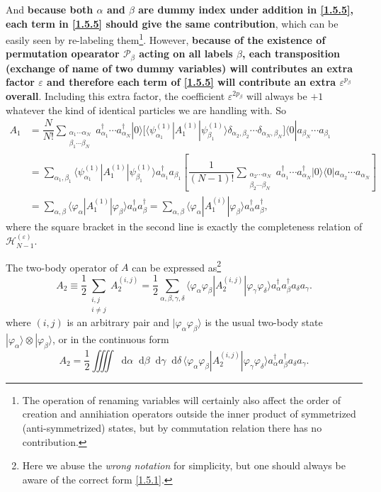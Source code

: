 \documentclass[b5paper,10pt,UTF8]{book}
\newcommand*\dd{\mathop{}\!\mathrm{d}}
\numberwithin{equation}{section}
\begin{document}
\begin{Proof}
			And \textbf{because both $\alpha$ and $\beta$ are dummy index under addition in \eqref{1.5.5}, each term in \eqref{1.5.5} should give the same contribution}, which can be easily seen by re-labeling them\footnote{ The operation of renaming variables will certainly also affect the order of creation and annihiation operators outside the inner product of symmetrized (anti-symmetrized) states, but by commutation relation there has no contribution.}. However, \textbf{because of the existence of permutation opearator $\mathcal{P}_\beta$ acting on all labels $\beta$, each transposition (exchange of name of two dummy variables) will contributes an extra factor $\varepsilon$ and therefore each term of \eqref{1.5.5} will contribute an extra $\varepsilon^{p_\beta}$ overall}. Including this extra factor, the coefficient $\varepsilon^{2p_\beta}$ will always be $+1$ whatever the kind of identical particles we are handling with. So 
			\begin{align}
				A_1&=\dfrac{N}{N!}\sum_{\substack{\alpha_1\cdots\alpha_N\\\beta_1\cdots\beta_N}}a_{\alpha_1}^\dagger\cdots a_{\alpha_N}^\dagger|0\rangle\bigg[\langle\psi_{\alpha_1}^{(1)}|A_1^{(1)}|\psi_{\beta_1}^{(1)}\rangle\delta_{\alpha_2,\beta_2}\cdots\delta_{\alpha_N,\beta_N}\bigg]\langle0|a_{\beta_N}\cdots a_{\beta_1}\nonumber\\
				&=\sum_{\alpha_1,\beta_1}\langle\psi_{\alpha_1}^{(1)}|A_1^{(1)}|\psi_{\beta_1}^{(1)}\rangle a_{\alpha_1}^\dagger a_{\beta_1}\left[\dfrac{1}{(N-1)!}\sum_{\substack{\alpha_2\cdots\alpha_N\\\beta_2\cdots\beta_N}}a_{\alpha_1}^\dagger\cdots a_{\alpha_N}^\dagger|0\rangle\langle0|a_{\alpha_2}\cdots a_{\alpha_N}\right]\nonumber\\
				&=\sum_{\alpha,\beta}\langle\varphi_\alpha|A_1^{(1)}|\varphi_\beta\rangle a_\alpha^\dagger a_\beta^\dagger=\sum_{\alpha,\beta}\langle\varphi_\alpha|A_1^{(i)}|\varphi_\beta\rangle a_\alpha^\dagger a_\beta^\dagger\nonumber,
			\end{align}
			where the square bracket in the second line is exactly the completeness relation of $\mathcal{H}_{N-1}^{(\varepsilon)}$.
		\end{Proof}
		\begin{Proposition}
			The two-body operator of $A$ can be expressed as\footnote{Here we abuse the \emph{wrong notation} for simplicity, but one should always be aware of the correct form \eqref{1.5.1}.}
			\begin{equation}\label{1.5.6}
				A_2\equiv\dfrac{1}{2}\sum_{\substack{i,j\\i\neq j}}A_2^{(i,j)}=\dfrac{1}{2}\sum_{\alpha,\beta,\gamma,\delta}\langle\varphi_\alpha\varphi_\beta|A_2^{(i,j)}|\varphi_\gamma\varphi_\delta\rangle a_\alpha^\dagger a_\beta^\dagger a_\delta a_\gamma.
			\end{equation}
			where $(i,j)$ is an arbitrary pair and $|\varphi_\alpha\varphi_\beta\rangle$ is the usual two-body state $|\varphi_\alpha\rangle\otimes|\varphi_\beta\rangle$,
			or in the continuous form
			$$A_2=\dfrac{1}{2}\iiiint\dd\alpha\dd\beta\dd\gamma\dd\delta\,\langle\varphi_\alpha\varphi_\beta|A_2^{(i,j)}|\varphi_\gamma\varphi_\delta\rangle a_\alpha^\dagger a_\beta^\dagger a_\delta a_\gamma.$$
		\end{Proposition}
\end{document}
